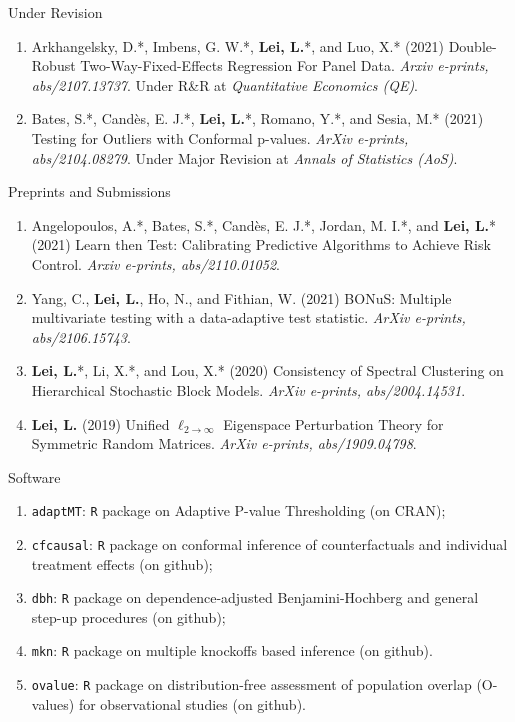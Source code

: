 \documentclass{article}
\begin{document}
\begin{large}
\noindent Under Revision
\end{large}

\begin{enumerate}
\item Arkhangelsky, D.*, Imbens, G. W.*, \textbf{Lei, L.}*, and Luo, X.* (2021) Double-Robust Two-Way-Fixed-Effects Regression For Panel Data. \emph{Arxiv e-prints, abs/2107.13737}. Under R\&R at \emph{Quantitative Economics (QE)}.
\item Bates, S.*, Cand\`{e}s, E. J.*, \textbf{Lei, L.}*, Romano, Y.*, and Sesia, M.* (2021) Testing for Outliers with Conformal p-values. \emph{ArXiv e-prints, abs/2104.08279}. Under Major Revision at \emph{Annals of Statistics (AoS)}.
\end{enumerate}

\begin{large}
\noindent Preprints and Submissions
\end{large}

\begin{enumerate}
\item Angelopoulos, A.*, Bates, S.*, Cand\`{e}s, E. J.*, Jordan, M. I.*, and \textbf{Lei, L.}* (2021) Learn then Test: Calibrating Predictive Algorithms to Achieve Risk Control. \emph{Arxiv e-prints, abs/2110.01052}.
\item Yang, C., \textbf{Lei, L.}, Ho, N., and Fithian, W. (2021) BONuS: Multiple multivariate testing with a data-adaptive test statistic. \emph{ArXiv e-prints, abs/2106.15743}.
\item \textbf{Lei, L.}*, Li, X.*, and Lou, X.* (2020) Consistency of Spectral Clustering on Hierarchical Stochastic Block Models. \emph{ArXiv e-prints, abs/2004.14531}.
\item \textbf{Lei, L.} (2019) Unified $\ell_{2\rightarrow\infty}$ Eigenspace Perturbation Theory for Symmetric Random Matrices. \emph{ArXiv e-prints, abs/1909.04798}.
\end{enumerate}

\begin{large}
\noindent Software
\end{large}

\begin{enumerate}
\item \texttt{adaptMT}: \texttt{R} package on Adaptive P-value Thresholding (on CRAN);
\item \texttt{cfcausal}: \texttt{R} package on conformal inference of counterfactuals and individual treatment effects (on github);
\item \texttt{dbh}: \texttt{R} package on dependence-adjusted Benjamini-Hochberg and general step-up procedures (on github);
\item \texttt{mkn}: \texttt{R} package on multiple knockoffs based inference (on github).
\item \texttt{ovalue}: \texttt{R} package on distribution-free assessment of population overlap (O-values) for observational studies (on github).
\end{enumerate}
\end{document}
